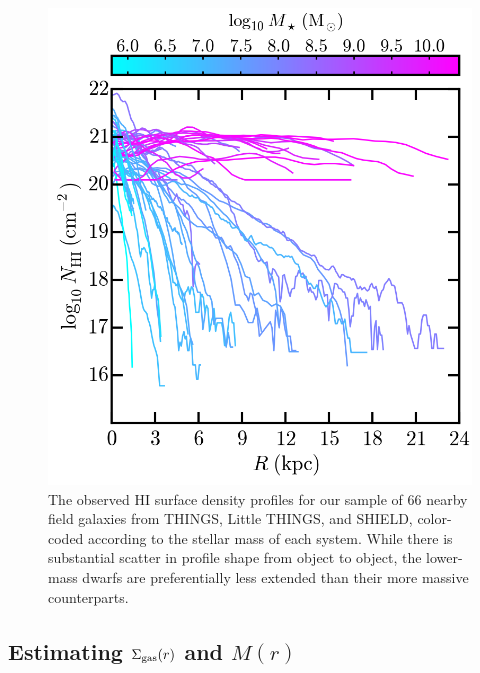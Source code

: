 \begin{figure}
 \centering
 \hspace*{-0.15in}
 \includegraphics[width=6in]{underpressure/f2.png}
 \caption[H{\scriptsize I} surface density profiles for nearby field galaxies]{The observed H{\scriptsize I} surface density profiles for
   our sample of $66$ nearby field galaxies from THINGS, Little
   THINGS, and SHIELD, color-coded according to the stellar mass of
   each system. While there is substantial scatter in profile shape
   from object to object, the lower-mass dwarfs are preferentially
   less extended than their more massive counterparts.}
 \label{fig:h1}
\end{figure}




\subsection{Estimating \boldmath$\Sigma_{\rm gas}(r)$ and \boldmath$M(r)$}
\label{subsec:sigM}

